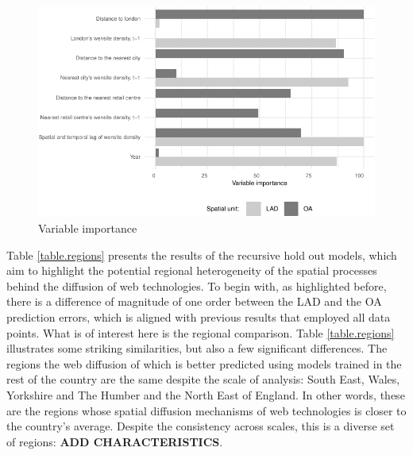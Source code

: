 \documentclass[
  authoryear,
  preprint,
  3p]{elsarticle}
\begin{document}
\begin{figure}[H]

{\centering \includegraphics[width=1\textwidth,height=0.6\textheight]{tranos2023_files/figure-pdf/varimp-1.pdf}

}

\caption{\label{var.imp}Variable importance}

\end{figure}%

Table \ref{table.regions} presents the results of the recursive hold out
models, which aim to highlight the potential regional heterogeneity of
the spatial processes behind the diffusion of web technologies. To begin
with, as highlighted before, there is a difference of magnitude of one
order between the LAD and the OA prediction errors, which is aligned
with previous results that employed all data points. What is of interest
here is the regional comparison. Table \ref{table.regions} illustrates
some striking similarities, but also a few significant differences. The
regions the web diffusion of which is better predicted using models
trained in the rest of the country are the same despite the scale of
analysis: South East, Wales, Yorkshire and The Humber and the North East
of England. In other words, these are the regions whose spatial
diffusion mechanisms of web technologies is closer to the country's
average. Despite the consistency across scales, this is a diverse set of
regions: \textbf{ADD CHARACTERISTICS}.
\end{document}
